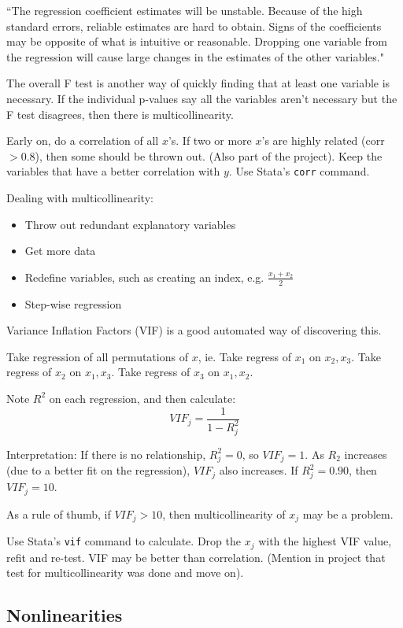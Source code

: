 \documentclass[11pt, oneside]{article}   	%
\begin{document}
``The regression coefficient estimates will be unstable. Because of the high standard errors, reliable estimates are hard to obtain. Signs of the coefficients may be opposite of what is intuitive or reasonable. Dropping one variable from the regression will cause large changes in the estimates of the other variables."

The overall F test is another way of quickly finding that at least one variable is necessary. If the individual p-values say all the variables aren't necessary but the F test disagrees, then there is multicollinearity.

Early on, do a correlation of all $x$'s. If two or more $x$'s are highly related (corr $> 0.8$), then some should be thrown out. (Also part of the project). Keep the variables that have a better correlation with $y$. Use Stata's \texttt{corr} command.

Dealing with multicollinearity:
\begin{itemize}
\item{Throw out redundant explanatory variables}
\item{Get more data}
\item{Redefine variables, such as creating an index, e.g. $\frac{x_1 + x_2}{2}$}
\item{Step-wise regression}
\end{itemize}

Variance Inflation Factors (VIF) is a good automated way of discovering this. 

Take regression of all permutations of $x$, ie. 
Take regress of $x_1$ on $x_2, x_3$.
Take regress of $x_2$ on $x_1, x_3$.
Take regress of $x_3$ on $x_1, x_2$.

Note $R^2$ on each regression, and then calculate:
\[
VIF_j = \frac{1} {1-R^2_j}
\]

Interpretation: If there is no relationship, $R^2_j = 0$, so $VIF_j=1$.  As $R_2$ increases (due to a better fit on the regression), $VIF_j$ also increases. If $R^2_j = 0.90$, then $VIF_j = 10$.  

As a rule of thumb, if $VIF_j > 10$, then multicollinearity of $x_j$ may be a problem.

Use Stata's \texttt{vif} command to calculate. Drop the $x_j$ with the highest VIF value, refit and re-test. VIF may be better than correlation. (Mention in project that test for multicollinearity was done and move on).

\subsection{Nonlinearities}
\end{document}
